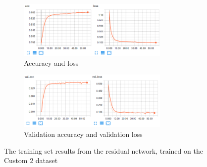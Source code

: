 \documentclass[USenglish]{ifimaster}  %
\begin{document}
\begin{figure}[ht]
\centering
\begin{subfigure}[b]{\textwidth}
\centering
\includegraphics[width=0.8\textwidth]{bilder/custom_2_training/Custom_2_residual_training_acc_results.png}
\caption{Accuracy and loss}
\label{fig:custom_2_residual_acc_result}
\end{subfigure}
\hfill
\begin{subfigure}[b]{\textwidth}
\centering
\includegraphics[width=0.8\textwidth]{bilder/custom_2_training/Custom_2_residual_training_val_acc_results.png}
\caption{Validation accuracy and validation loss}
\label{fig:custom_2_residual_val_acc_result}
\end{subfigure}
\caption{The training set results from the residual network, trained on the Custom 2 dataset}
\label{fig:custom_2_residual_result}
\end{figure}
\end{document}
